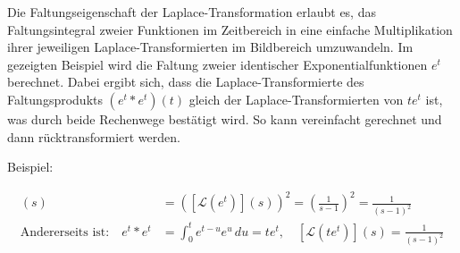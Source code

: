 Die Faltungseigenschaft der Laplace-Transformation erlaubt es, das Faltungsintegral zweier Funktionen im Zeitbereich in eine einfache Multiplikation ihrer jeweiligen Laplace-Transformierten im Bildbereich umzuwandeln. Im gezeigten Beispiel wird die Faltung zweier identischer Exponentialfunktionen $e^t$ berechnet. Dabei ergibt sich, dass die Laplace-Transformierte des Faltungsprodukts $(e^t * e^t)(t)$ gleich der Laplace-Transformierten von $t e^t$ ist, was durch beide Rechenwege bestätigt wird.
So kann vereinfacht gerechnet und dann rücktransformiert werden.

Beispiel:
    
    \begin{align}
    [\mathcal{L}(e^t * e^t)](s)
    &= \left( [\mathcal{L}(e^t)](s) \right)^2
    = \left( \frac{1}{s - 1} \right)^2
    = \frac{1}{(s - 1)^2} \nonumber \\
    \text{Andererseits ist:} \quad
    e^t * e^t
    &= \int_0^t e^{t - u} e^u \, du
    = t e^t,
    \quad [\mathcal{L}(t e^t)](s)
    = \frac{1}{(s - 1)^2}
    \label{eq:laplace_faltung_beispiel}
    \end{align}
    \cite[S.~885]{buch1}
    

